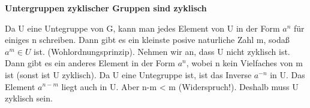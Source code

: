 \documentclass{homework}
\begin{document}
\begin{problem}
    \textbf{Untergruppen zyklischer Gruppen sind zyklisch}
\end{problem}

\begin{solution}
Da U eine Untegruppe von G, kann man jedes Element von U in der Form $a^{n}$ für einiges n schreiben. Dann gibt es ein kleinste posive naturliche Zahl m, sodaß $a^{m} \in U $ ist. (Wohlordnungsprinzip).
Nehmen wir an, dass U nicht zyklisch ist. Dann gibt es ein anderes Element in der Form $a^{n}$, wobei n kein Vielfaches von m ist (sonst ist U zyklisch). Da U eine Untegruppe ist, ist das Inverse $a^{-n}$ in U. Das Element $a^{n-m}$ liegt auch in U. Aber n-m < m (Widerspruch!). Deshalb muss U zyklisch sein.
\end{solution}
\end{document}
